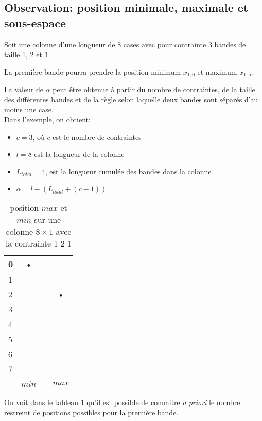 \documentclass[a4paper,12pt]{report}
\newcommand\black{\cellcolor{black}}
\newcommand\grey{\cellcolor{black!50}}
\begin{document}
\subsection{Observation: position minimale, maximale et sous-espace}

Soit une colonne d'une longueur de 8 cases avec pour contrainte 3 bandes de taille 1, 2 et 1.

La première bande pourra prendre la position minimum $x_{1,0}$ et maximum $x_{1,\alpha}$.

La valeur de $\alpha$ peut être obtenue à partir du nombre de contraintes, de la taille des différentes bandes et de la règle selon laquelle deux bandes sont séparés d'au moins une case.\\

Dans l'exemple, on obtient:
\begin{itemize}
\item[] $c = 3$, où $c$ est le nombre de contraintes
\item[] $l = 8$ est la longueur de la colonne
\item[] $L_{total} = 4$, est la longueur cumulée des bandes dans la colonne
\item[] $\alpha = l-(L_{total}+(c-1))$
\end{itemize}

\begin{table}[H]
\centering
\begin{tabular}{|l||c|c|c|}
\hline 
0&\black• &  &  \\ 
\hline 
1 & &  &  \\ 
\hline 
2 & \grey &  & \black• \\ 
\hline 
3&\grey &  & \\ 
\hline 
4&\grey &  & \grey \\ 
\hline 
5&\grey &  & \grey \\ 
\hline 
6&\grey &  & \grey \\ 
\hline 
7&\grey &  & \grey \\ 
\hline &&\\
[-1.3em]\hline
&$min$ &  & $max$ \\ 
\hline 
\end{tabular} 
\caption{\label{bande8X1} position $max$ et $min$ sur une colonne $8\times1$ avec la contrainte 1 2 1}
\end{table}


On voit dans le tableau \ref{bande8X1} qu'il est possible de connaitre \textit{a priori} le nombre restreint de positions possibles pour la première bande. 
\end{document}
